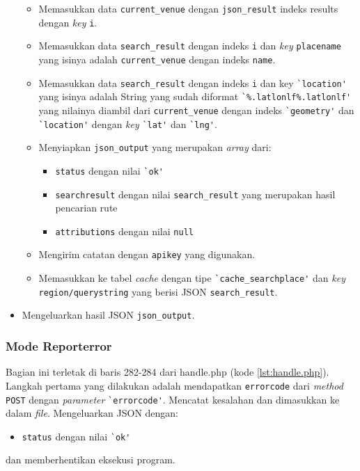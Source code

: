 \begin{itemize}
	\begin{itemize}
		\item Memasukkan data \verb!current_venue! dengan \verb!json_result! indeks results dengan \textit{key} \verb!i!.
		\item Memasukkan data \verb!search_result! dengan indeks \verb!i! dan \textit{key} \verb!placename! yang isinya adalah \verb!current_venue! dengan indeks \verb!name!.
		\item Memasukkan data \verb!search_result! dengan indeks \verb!i! dan key \verb!`location'! yang isinya adalah String yang sudah diformat \verb!`%.latlonlf%.latlonlf'! yang nilainya diambil dari \verb!current_venue! dengan indeks \verb!`geometry'! dan \verb!`location'! dengan \textit{key} \verb!`lat'! dan \verb!`lng'!.
		\item Menyiapkan \verb!json_output! yang merupakan \textit{array} dari:
		\begin{itemize}
			\item \verb!status! dengan nilai \verb!`ok'!
			\item \verb!searchresult! dengan nilai \verb!search_result! yang merupakan hasil pencarian rute
			\item \verb!attributions! dengan nilai \verb!null!
		\end{itemize}
		\item Mengirim catatan dengan \verb!apikey! yang digunakan.
		\item Memasukkan ke tabel \textit{cache} dengan tipe \verb!`cache_searchplace'! dan \textit{key} \verb!region/querystring! yang berisi JSON \verb!search_result!.
	\end{itemize}
	\item Mengeluarkan hasil JSON \verb!json_output!.
\end{itemize}

\subsubsection{Mode Reporterror}
Bagian ini terletak di baris 282-284 dari handle.php (kode \ref{lst:handle.php}). Langkah pertama yang dilakukan adalah mendapatkan \verb!errorcode! dari \textit{method} \verb!POST! dengan \textit{parameter} \verb!`errorcode'!. Mencatat kesalahan dan dimasukkan ke dalam \textit{file}. Mengeluarkan JSON dengan:
\begin{itemize}
			\item \verb!status! dengan nilai \verb!`ok'!
\end{itemize} 
dan memberhentikan eksekusi program.

